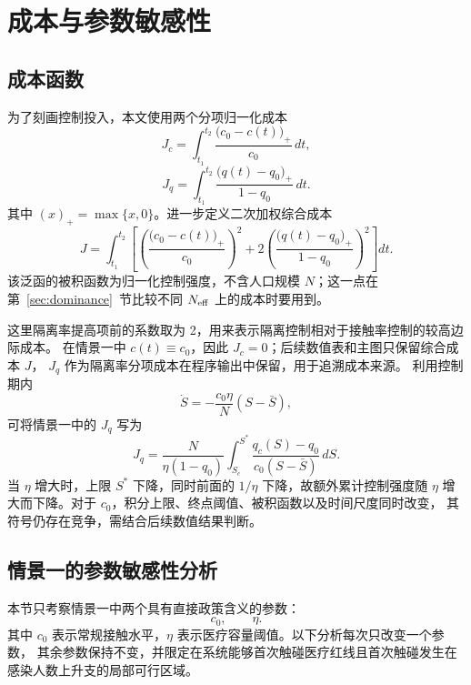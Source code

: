 \documentclass[lang=cn,a4paper,newtx]{elegantpaper}
\numberwithin{equation}{section}
\theoremstyle{plain}
\begin{document}
\section{成本与参数敏感性}
\label{sec:cost}

\subsection{成本函数}

为了刻画控制投入，本文使用两个分项归一化成本
\begin{equation}
J_c=\int_{t_1}^{t_2} \frac{\bigl(c_0-c(t)\bigr)_+}{c_0}\,dt,
\end{equation}
\begin{equation}
J_q=\int_{t_1}^{t_2} \frac{\bigl(q(t)-q_0\bigr)_+}{1-q_0}\,dt.
\end{equation}
其中 $(x)_+=\max\{x,0\}$。进一步定义二次加权综合成本
\begin{equation}
J
=
\int_{t_1}^{t_2}
\left[
\left(\frac{\bigl(c_0-c(t)\bigr)_+}{c_0}\right)^2
+
2\left(\frac{\bigl(q(t)-q_0\bigr)_+}{1-q_0}\right)^2
\right]dt.
\label{eq:cost:J}
\end{equation}
该泛函的被积函数为归一化控制强度，不含人口规模 $N$；这一点在第~\ref{sec:dominance}~节比较不同 $N_{\rm eff}$ 上的成本时要用到。

这里隔离率提高项前的系数取为 2，用来表示隔离控制相对于接触率控制的较高边际成本。
在情景一中 $c(t)\equiv c_0$，因此 $J_c=0$；后续数值表和主图只保留综合成本 $J$，
$J_q$ 作为隔离率分项成本在程序输出中保留，用于追溯成本来源。
利用控制期内
\[
\dot S=-\frac{c_0\eta}{N}(S-\bar S),
\]
可将情景一中的 $J_q$ 写为
\begin{equation}
J_q
=
\frac{N}{\eta(1-q_0)}
\int_{S_c}^{S^*}
\frac{q_c(S)-q_0}{c_0(S-\bar S)}\,dS.
\end{equation}
当 $\eta$ 增大时，上限 $S^*$ 下降，同时前面的 $1/\eta$ 下降，故额外累计控制强度随
$\eta$ 增大而下降。对于 $c_0$，积分上限、终点阈值、被积函数以及时间尺度同时改变，
其符号仍存在竞争，需结合后续数值结果判断。



\subsection{情景一的参数敏感性分析}
本节只考察情景一中两个具有直接政策含义的参数：
\[
c_0,\qquad \eta .
\]
其中 $c_0$ 表示常规接触水平，$\eta$ 表示医疗容量阈值。以下分析每次只改变一个参数，
其余参数保持不变，并限定在系统能够首次触碰医疗红线且首次触碰发生在感染人数上升支的局部可行区域。
\end{document}

